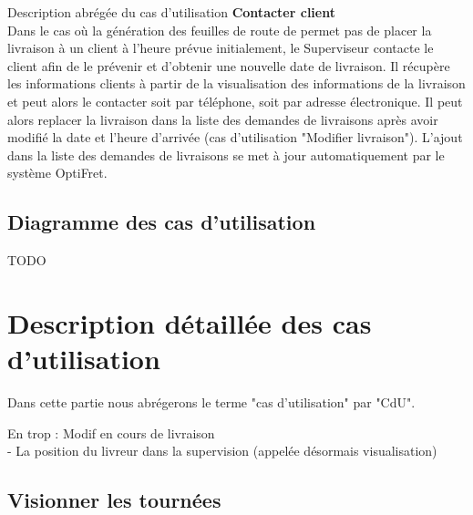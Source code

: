 \documentclass[a4paper, 10pt]{article}
\begin{document}
Description abrégée du cas d'utilisation
\textbf{Contacter client} \\

Dans le cas où la génération des feuilles de route de permet pas de placer la
livraison à un client à l'heure prévue initialement, le Superviseur contacte le
client afin de le prévenir et d'obtenir une nouvelle date de livraison. Il
récupère les informations clients à partir de la visualisation des informations
de la livraison et peut alors le contacter soit par téléphone, soit par adresse
électronique. Il peut alors replacer la livraison dans la liste des demandes de
livraisons après avoir modifié la date et l'heure d'arrivée (cas d'utilisation
"Modifier livraison"). L'ajout dans la liste des demandes de livraisons se met
à jour automatiquement par le système OptiFret. \\

\subsection{Diagramme des cas d'utilisation}
{\huge TODO}


\section{Description détaillée des cas d'utilisation}

Dans cette partie nous abrégerons le terme "cas d'utilisation" par "CdU".

En trop : Modif en cours de livraison \\
- La position du livreur dans la supervision (appelée désormais visualisation)\\

\subsection{Visionner les tournées}
\end{document}
